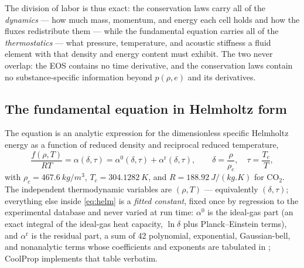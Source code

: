 \documentclass[11pt]{article}
\newcommand{\co}{CO$_2$}
\begin{document}
The division of labor is thus exact: the conservation laws carry all
of the \emph{dynamics} --- how much mass, momentum, and energy each
cell holds and how the fluxes redistribute them --- while the
fundamental equation carries all of the \emph{thermostatics} --- what
pressure, temperature, and acoustic stiffness a fluid element with
that density and energy content must exhibit. The two never overlap:
the EOS contains no time derivative, and the conservation laws contain
no substance-specific information beyond $p(\rho,e)$ and its
derivatives.

\subsection{The fundamental equation in Helmholtz form}
\label{app:helmholtz}

The \citet{span1996} equation is an analytic expression for the
dimensionless specific Helmholtz energy as a function of reduced
density and reciprocal reduced temperature,
\begin{equation}
\frac{f(\rho, T)}{R T}
 = \alpha(\delta, \tau)
 = \alpha^{0}(\delta, \tau) + \alpha^{\mathrm{r}}(\delta, \tau),
\qquad
\delta = \frac{\rho}{\rho_c}, \quad \tau = \frac{T_c}{T},
\label{eq:helm}
\end{equation}
with $\rho_c = \SI{467.6}{kg/m^3}$, $T_c = \SI{304.1282}{K}$, and
$R = \SI{188.92}{J/(kg.K)}$ for \co. The independent thermodynamic
variables are $(\rho, T)$ --- equivalently $(\delta, \tau)$; everything
else inside \cref{eq:helm} is a \emph{fitted constant}, fixed once by
regression to the experimental database and never varied at run time:
$\alpha^{0}$ is the ideal-gas part (an exact integral of the
ideal-gas heat capacity, $\ln\delta$ plus Planck--Einstein terms), and
$\alpha^{\mathrm{r}}$ is the residual part, a sum of 42 polynomial,
exponential, Gaussian-bell, and nonanalytic terms whose coefficients
and exponents are tabulated in \citet{span1996}; CoolProp
\citep{bell2014} implements that table verbatim.
\end{document}
